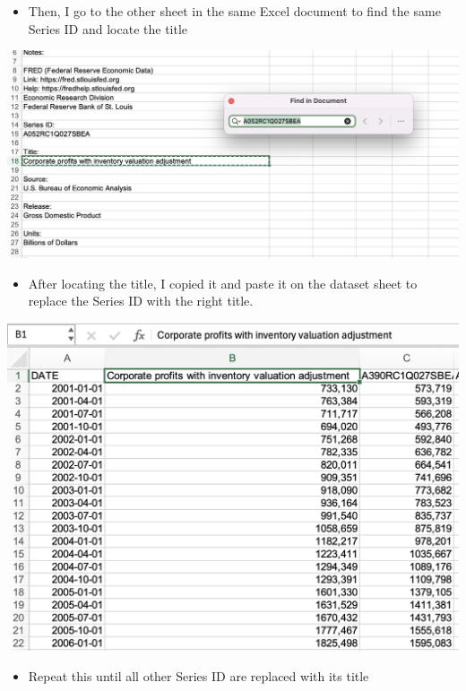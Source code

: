 \documentclass[
  letterpaper,
  DIV=11,
  numbers=noendperiod]{scrreprt}
\providecommand{\tightlist}{%
  \setlength{\itemsep}{0pt}\setlength{\parskip}{0pt}}\usepackage{longtable,booktabs,array}
\begin{document}
\begin{itemize}
\tightlist
\item
  Then, I go to the other sheet in the same Excel document to find the
  same Series ID and locate the title
\end{itemize}

\includegraphics{./Excel_1_Unit/Week1_Janice/Week 1/Week 1 Friday/Replacing_column_titles2.png}

\begin{itemize}
\tightlist
\item
  After locating the title, I copied it and paste it on the dataset
  sheet to replace the Series ID with the right title.
\end{itemize}

\includegraphics{./Excel_1_Unit/Week1_Janice/Week 1/Week 1 Friday/Replacing_column_titles3.png}

\begin{itemize}
\tightlist
\item
  Repeat this until all other Series ID are replaced with its title
\end{itemize}
\end{document}
